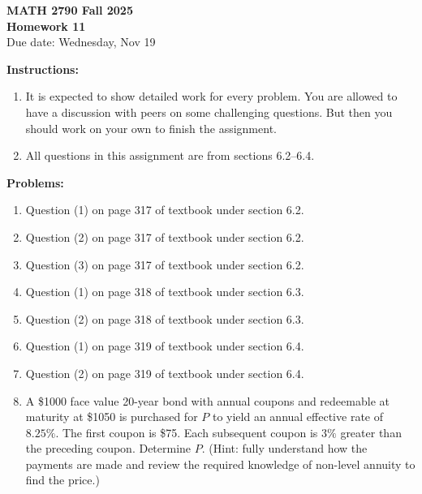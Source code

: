 \documentclass[12pt]{article}
\begin{document}
\begin{center}
\textbf{\Large MATH 2790 Fall 2025}\\[1em]
\textbf{\Large Homework 11}\\[0.5em]
Due date: Wednesday, Nov 19
\end{center}

\bigskip

\textbf{Instructions:}

\begin{enumerate}[label=(\alph*)]
\item It is expected to show detailed work for every problem. You are allowed to have a
discussion with peers on some challenging questions. But then you should work on
your own to finish the assignment.

\item All questions in this assignment are from sections 6.2--6.4.
\end{enumerate}

\bigskip

\textbf{Problems:}

\begin{enumerate}
\item Question (1) on page 317 of textbook under section 6.2.

\item Question (2) on page 317 of textbook under section 6.2.

\item Question (3) on page 317 of textbook under section 6.2.

\item Question (1) on page 318 of textbook under section 6.3.

\item Question (2) on page 318 of textbook under section 6.3.

\item Question (1) on page 319 of textbook under section 6.4.

\item Question (2) on page 319 of textbook under section 6.4.

\item A \$1000 face value 20-year bond with annual coupons and redeemable at maturity at \$1050 is purchased for $P$ to yield an annual effective rate of $8.25\%$. The first coupon is \$75. Each subsequent coupon is $3\%$ greater than the preceding coupon. Determine $P$. (Hint: fully understand how the payments are made and review the required knowledge of non-level annuity to find the price.)
\end{enumerate}
\end{document}
